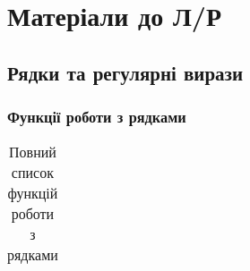 \chapter{Матеріали до Л/Р }

\section{Рядки та регулярні вирази}
\subsection{Функції роботи з рядками}
\label{str-func:app}
\nopagebreak[4]


\begin{longtable}[t]{|l|p{21em}|}

\caption{\space Повний список функцій роботи з рядками} \label{str-func:table}\\
\hline


\end{longtable}
